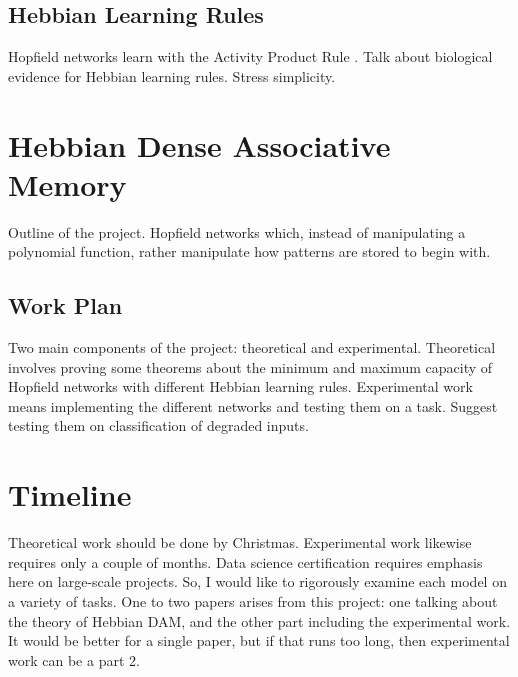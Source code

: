 \documentclass{article}
\theoremstyle{definition}
\begin{document}
\subsection{Hebbian Learning Rules}\label{sec:hebbian-learning-rules}

Hopfield networks learn with the Activity Product Rule \parencite{haykin_neural_2009}.
Talk about biological evidence for Hebbian learning rules. Stress simplicity.

\section{Hebbian Dense Associative Memory}\label{sec:hebbian-dam}

Outline of the project. Hopfield networks which, instead of manipulating a polynomial
function, rather manipulate how patterns are stored to begin with.

\subsection{Work Plan}\label{sec:work-plan}

Two main components of the project: theoretical and experimental. Theoretical
involves proving some theorems about the minimum and maximum capacity of 
Hopfield networks with different Hebbian learning rules. Experimental work
means implementing the different networks and testing them on a task. Suggest
testing them on classification of degraded inputs.

\section{Timeline}\label{sec:timeline}

Theoretical work should be done by Christmas. Experimental work likewise
requires only a couple of months. Data science certification requires emphasis
here on large-scale projects. So, I would like to rigorously examine
each model on a variety of tasks. One to two papers arises from this project:
one talking about the theory of Hebbian DAM, and the other part including
the experimental work. It would be better for a single paper, but if that 
runs too long, then experimental work can be a part 2.

\printbibliography
\end{document}
